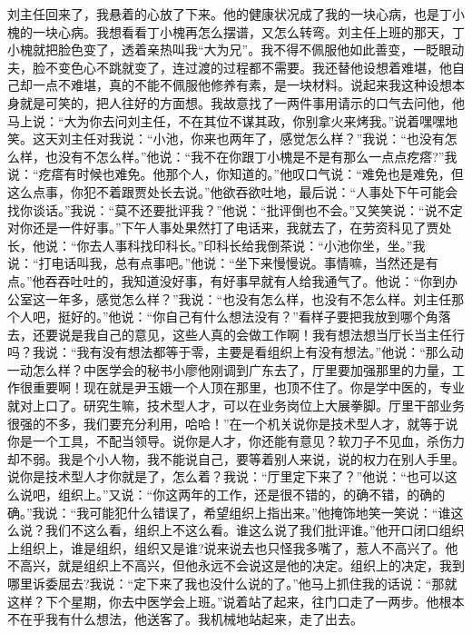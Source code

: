 \documentclass[12pt,oneside]{book}
\begin{document}
刘主任回来了，我悬着的心放了下来。他的健康状况成了我的一块心病，也是丁小槐的一块心病。我想看看丁小槐再怎么摆谱，又怎么转弯。刘主任上班的那天，丁小槐就把脸色变了，透着亲热叫我``大为兄''。我不得不佩服他如此善变，一眨眼动夫，脸不变色心不跳就变了，连过渡的过程都不需要。我还替他设想着难堪，他自己却一点不难堪，真的不能不佩服他修养有素，是一块材料。说起来我这种设想本身就是可笑的，把人往好的方面想。我故意找了一两件事用请示的口气去问他，他马上说：``大为你去问刘主任，不在其位不谋其政，你别拿火来烤我。''说着嘿嘿地笑。这天刘主任对我说：``小池，你来也两年了，感觉怎么样？''我说：``也没有怎么样，也没有不怎么样。''他说：``我不在你跟丁小槐是不是有那么一点点疙瘩?''我说：``疙瘩有时候也难免。他那个人，你知道的。''他叹口气说：``难免也是难免，但这么点事，你犯不着跟贾处长去说。''他欲吞欲吐地，最后说：``人事处下午可能会找你谈话。''我说：``莫不还要批评我？''他说：``批评倒也不会。''又笑笑说：``说不定对你还是一件好事。''下午人事处果然打了电话来，我就去了，在劳资科见了贾处长，他说：``你去人事科找印科长。''印科长给我倒茶说：``小池你坐，坐。''我说：``打电话叫我，总有点事吧。''他说：``坐下来慢慢说。事情嘛，当然还是有点。''他吞吞吐吐的，我知道没好事，有好事早就有人给我通气了。他说：``你到办公室这一年多，感觉怎么样？''我说：``也没有怎么样，也没有不怎么样。刘主任那个人吧，挺好的。''他说：``你自己有什么想法没有？''看样子要把我放到哪个角落去，还要说是我自己的意见，这些人真的会做工作啊！我有想法想当厅长当主任行吗？我说：``我有没有想法都等于零，主要是看组织上有没有想法。''他说：``那么动一动怎么样？中医学会的秘书小廖他刚调到广东去了，厅里要加强那里的力量，工作很重要啊！现在就是尹玉娥一个人顶在那里，也顶不住了。你是学中医的，专业就对上口了。研究生嘛，技术型人才，可以在业务岗位上大展拳脚。厅里干部业务很强的不多，我们要充分利用，哈哈！''在一个机关说你是技术型人才，就等于说你是一个工具，不配当领导。说你是人才，你还能有意见？软刀子不见血，杀伤力却不弱。我是个小人物，我不能说自己，要等着别人来说，说的权力在别人手里。说你是技术型人才你就是了，怎么着？我说：``厅里定下来了？''他说：``也可以这么说吧，组织上。''又说：``你这两年的工作，还是很不错的，的确不错，的确的确。''我说：``我可能犯什么错误了，希望组织上指出来。''他掩饰地笑一笑说：``谁这么说？我们不这么看，组织上不这么看。谁这么说了我们批评谁。''他开口闭口组织上组织上，谁是组织，组织又是谁?说来说去也只怪我多嘴了，惹人不高兴了。他不高兴，就是组织上不高兴，但他永远不会说这是他的决定。组织上的决定，我到哪里诉委屈去?我说：``定下来了我也没什么说的了。''他马上抓住我的话说：``那就这样？下个星期，你去中医学会上班。''说着站了起来，往门口走了一两步。他根本不在乎我有什么想法，他送客了。我机械地站起来，走了出去。
\end{document}

